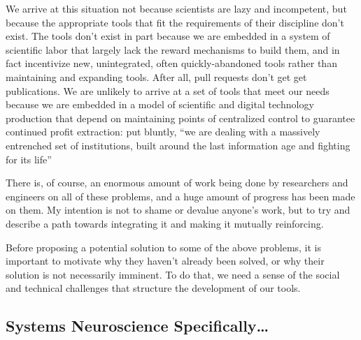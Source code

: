\documentclass[10pt]{article}
\begin{document}
\begin{multicols}{2}
We arrive at this situation not because scientists are lazy and
incompetent, but because the appropriate tools that fit the requirements
of their discipline don't exist. The tools don't exist in part because
we are embedded in a system of scientific labor that largely lack the
reward mechanisms to build them, and in fact incentivize new,
unintegrated, often quickly-abandoned tools rather than maintaining and
expanding tools. After all, pull requests don't get get publications. We
are unlikely to arrive at a set of tools that meet our needs because we
are embedded in a model of scientific and digital technology production
that depend on maintaining points of centralized control to guarantee
continued profit extraction: put bluntly, ``we are dealing with a
massively entrenched set of institutions, built around the last
information age and fighting for its life'' \cite{bowkerInformationInfrastructureStudies2010} 

There is, of course, an enormous amount of work being done by
researchers and engineers on all of these problems, and a huge amount of
progress has been made on them. My intention is not to shame or devalue
anyone's work, but to try and describe a path towards integrating it and
making it mutually reinforcing.

Before proposing a potential solution to some of the above problems, it
is important to motivate why they haven't already been solved, or why
their solution is not necessarily imminent. To do that, we need a sense
of the social and technical challenges that structure the development of
our tools. 
\end{multicols}


\hypertarget{systems-neuroscience-specifically}{%
\subsection{Systems Neuroscience
Specifically\ldots{}}\label{systems-neuroscience-specifically}}
\end{document}
